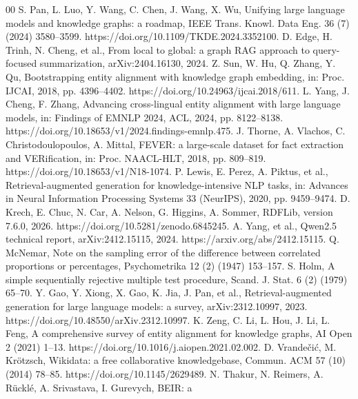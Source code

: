 \documentclass[a4paper,fleqn]{cas-dc}
\begin{document}
\balance
\begin{thebibliography}{00}\footnotesize
{}
S. Pan, L. Luo, Y. Wang, C. Chen, J. Wang, X. Wu, Unifying large language
models and knowledge graphs: a roadmap, IEEE Trans. Knowl. Data Eng. 36 (7)
(2024) 3580--3599. https://doi.org/10.1109/TKDE.2024.3352100.
D. Edge, H. Trinh, N. Cheng, et al., From local to global: a graph RAG approach
to query-focused summarization, arXiv:2404.16130, 2024.
Z. Sun, W. Hu, Q. Zhang, Y. Qu, Bootstrapping entity alignment with knowledge
graph embedding, in: Proc. IJCAI, 2018, pp. 4396--4402.
https://doi.org/10.24963/ijcai.2018/611.
L. Yang, J. Cheng, F. Zhang, Advancing cross-lingual entity alignment with
large language models, in: Findings of EMNLP 2024, ACL, 2024, pp. 8122--8138.
https://doi.org/10.18653/v1/2024.findings-emnlp.475.
J. Thorne, A. Vlachos, C. Christodoulopoulos, A. Mittal, FEVER: a large-scale
dataset for fact extraction and VERification, in: Proc. NAACL-HLT, 2018,
pp. 809--819. https://doi.org/10.18653/v1/N18-1074.
P. Lewis, E. Perez, A. Piktus, et al., Retrieval-augmented generation for
knowledge-intensive NLP tasks, in: Advances in Neural Information Processing
Systems 33 (NeurIPS), 2020, pp. 9459--9474.
D. Krech, E. Chuc, N. Car, A. Nelson, G. Higgins, A. Sommer, RDFLib,
version 7.6.0, 2026. https://doi.org/10.5281/zenodo.6845245.
A. Yang, et al., Qwen2.5 technical report, arXiv:2412.15115, 2024.
https://arxiv.org/abs/2412.15115.
Q. McNemar, Note on the sampling error of the difference between correlated
proportions or percentages, Psychometrika 12 (2) (1947) 153--157.
S. Holm, A simple sequentially rejective multiple test procedure, Scand. J.
Stat. 6 (2) (1979) 65--70.
Y. Gao, Y. Xiong, X. Gao, K. Jia, J. Pan, et al., Retrieval-augmented
generation for large language models: a survey, arXiv:2312.10997, 2023.
https://doi.org/10.48550/arXiv.2312.10997.
K. Zeng, C. Li, L. Hou, J. Li, L. Feng, A comprehensive survey of entity
alignment for knowledge graphs, AI Open 2 (2021) 1--13.
https://doi.org/10.1016/j.aiopen.2021.02.002.
D. Vrande\v{c}i\'{c}, M. Kr\"{o}tzsch, Wikidata: a free collaborative
knowledgebase, Commun. ACM 57 (10) (2014) 78--85.
https://doi.org/10.1145/2629489.
N. Thakur, N. Reimers, A. R\"{u}ckl\'{e}, A. Srivastava, I. Gurevych, BEIR: a

\end{thebibliography}
\end{document}
